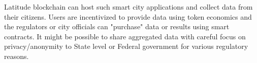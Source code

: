 Latitude blockchain can host such smart city applications and collect data from their citizens. Users are incentivized
to provide data using token economics and the regulators or city officials can "purchase" data or results using smart
contracts. It might be possible to share aggregated data with careful focus on privacy/anonymity to State level or
Federal government for various regulatory reasons. 

%
